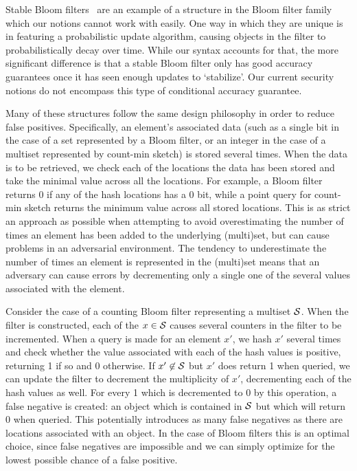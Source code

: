 Stable Bloom filters~\cite{xxx} are an example of a structure in the Bloom filter family which our notions cannot work with easily. One way in which they are unique is in featuring a probabilistic update algorithm, causing objects in the filter to probabilistically decay over time. While our syntax accounts for that, the more significant difference is that a stable Bloom filter only has good accuracy guarantees once it has seen enough updates to `stabilize'. Our current security notions do not encompass this type of conditional accuracy guarantee.

Many of these structures follow the same design philosophy in order to reduce false positives. Specifically, an element's associated data (such as a single bit in the case of a set represented by a Bloom filter, or an integer in the case of a multiset represented by count-min sketch) is stored several times. When the data is to be retrieved, we check each of the locations the data has been stored and take the minimal value across all the locations. For example, a Bloom filter returns 0 if any of the hash locations has a 0 bit, while a point query for count-min sketch returns the minimum value across all stored locations. This is as strict an approach as possible when attempting to avoid overestimating the number of times an element has been added to the underlying (multi)set, but can cause problems in an adversarial environment. The tendency to underestimate the number of times an element is represented in the (multi)set means that an adversary can cause errors by decrementing only a single one of the several values associated with the element.

Consider the case of a counting Bloom filter representing a multiset $\mathcal{S}$. When the filter is constructed, each of the $x \in \mathcal{S}$ causes several counters in the filter to be incremented. When a query is made for an element $x'$, we hash $x'$ several times and check whether the value associated with each of the hash values is positive, returning 1 if so and 0 otherwise. If $x' \not\in \mathcal{S}$ but $x'$ does return 1 when queried, we can update the filter to decrement the multiplicity of $x'$, decrementing each of the hash values as well. For every 1 which is decremented to 0 by this operation, a false negative is created: an object which is contained in $\mathcal{S}$ but which will return 0 when queried. This potentially introduces as many false negatives as there are locations associated with an object. In the case of Bloom filters this is an optimal choice, since false negatives are impossible and we can simply optimize for the lowest possible chance of a false positive.

